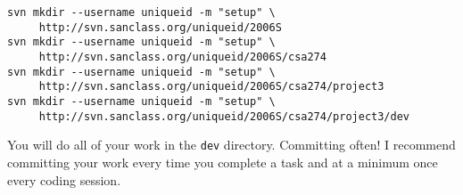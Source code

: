 \documentclass[10pt]{article}
\begin{document}
\begin{verbatim}
svn mkdir --username uniqueid -m "setup" \
     http://svn.sanclass.org/uniqueid/2006S
svn mkdir --username uniqueid -m "setup" \
     http://svn.sanclass.org/uniqueid/2006S/csa274
svn mkdir --username uniqueid -m "setup" \
     http://svn.sanclass.org/uniqueid/2006S/csa274/project3
svn mkdir --username uniqueid -m "setup" \
     http://svn.sanclass.org/uniqueid/2006S/csa274/project3/dev
\end{verbatim}

\par
You will do all of your work in the {\tt dev} directory.   Committing often!  I recommend committing your work every time you complete a task and at a minimum once every coding session.
\end{document}
